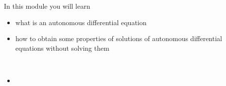 In this module you will learn
\begin{itemize}
	\item what is an autonomous differential equation
	\item how to obtain some properties of solutions of autonomous differential equations without solving them
\end{itemize}

\hfill \\





\begin{video}
\begin{itemize}
	\item {}
\end{itemize}	
\end{video}

